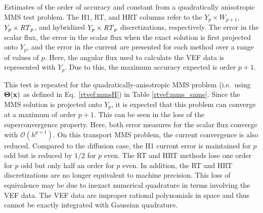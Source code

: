 \documentclass[../doc.tex]{subfiles}
\begin{document}
\begin{table}
\centering
\caption{Estimates of the order of accuracy and constant from a quadratically anisotropic MMS test problem. The H1, RT, and HRT columns refer to the $Y_p\times W_{p+1}$, $Y_p\times \mathit{RT}_p$, and hybridized $Y_p\times \mathit{RT}_p$ discretizations, respectively. The error in the scalar flux, the error in the scalar flux when the exact solution is first projected onto $Y_p$, and the error in the current are presented for each method over a range of values of $p$. Here, the angular flux used to calculate the VEF data is represented with $Y_p$. Due to this, the maximum accuracy expected is order $p+1$. }
\label{rtvef:mms_same}

\end{table}
This test is repeated for the quadratically-anisotropic MMS problem (i.e.~using $\boldsymbol{\mathrm{\Theta}}(\boldsymbol{\mathrm{x}})$ as defined in Eq.~\ref{rtvef:mmsH}) in Table \ref{rtvef:mms_same}. Since the MMS solution is projected onto $Y_p$, it is expected that this problem can converge at a maximum of order $p+1$. This can be seen in the loss of the superconvergence property. Here, both error measures for the scalar flux converge with $\mathcal{O}(h^{p+1})$. On this transport MMS problem, the current convergence is also reduced. 
Compared to the diffusion case, the H1 current error is maintained for $p$ odd but is reduced by $1/2$ for $p$ even. The RT and HRT methods lose one order for $p$ odd but only half an order for $p$ even. In addition, the RT and HRT discretizations are no longer equivalent to machine precision. This loss of equivalence may be due to inexact numerical quadrature in terms involving the VEF data. The VEF data are improper rational polynomials in space and thus cannot be exactly integrated with Gaussian quadrature. 
\end{document}
